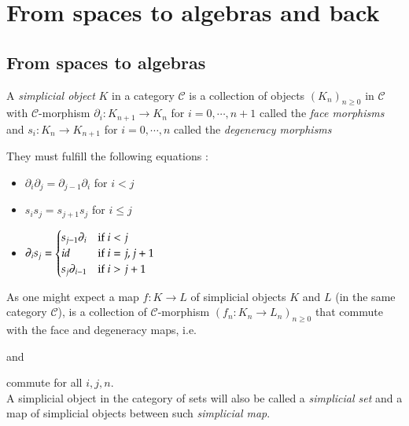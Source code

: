 
 \section{From spaces to algebras and back}
 
 \subsection{From spaces to algebras}
 
 \begin{Definition}
  A \emph{simplicial object} $K$ in a category $\mathscr{C}$
  is a collection of objects $(K_n)_{n \geq 0}$ in $\mathscr{C}$ with $\mathscr{C}$-morphism
  $\partial_i \colon K_{n+1} \to K_n$ for $i = 0, \cdots, n+1$ called the \emph{face morphisms} and \newline
  $s_i \colon K_n \to K_{n+1}$ for $i = 0, \cdots, n$ called the \emph{degeneracy morphisms}
  
  They must fulfill the following equations : %
  \begin{itemize}
   \item $\partial_i \partial_j = \partial_{j-1} \partial_i$ for $i < j$
   \item  $s_i s_j = s_{j+1} s_j$ for $ i \leq j$
   \item $ \partial_i s_j = \begin{cases}
              s_{j-1} \partial_i 	&\text{if $i < j$} \\
              id 	&\text{if $i = j, j+1$} \\
              s_j \partial_{i-1}	 &\text{if $ i > j + 1$}
             
             \end{cases}
    $	
    \end{itemize}
    As one might expect a map $f \colon K \to L$ of simplicial objects $K$ and $L$ (in the same category $\mathscr{C}$), is a collection
    of $\mathscr{C}$-morphism $( f_n \colon K_n \to L_n)_{ n \geq 0}$ that commute with the face and degeneracy maps, i.e.
    \begin{multicols}{3}
     \columnbreak
    \begin{center}
     and
    \end{center}
    \columnbreak
    \end{multicols}
    
    
    
    commute for all $i,j,n$. \\
   A simplicial object in the category of sets will also be called a \emph{simplicial set} and a map 
   of simplicial objects between such \emph{simplicial map}.
  
 \end{Definition}

